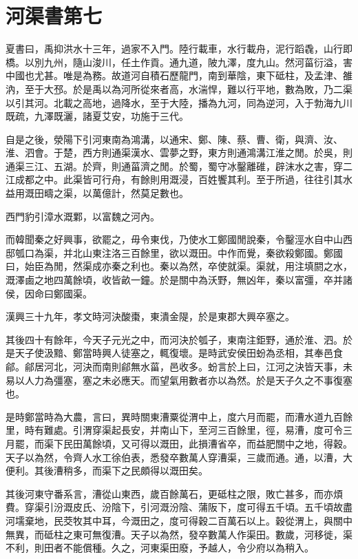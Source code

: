 \chapter{河渠書第七}

夏書曰，禹抑洪水十三年，過家不入門。陸行載車，水行載舟，泥行蹈毳，山行即橋。以別九州，隨山浚川，任土作貢。通九道，陂九澤，度九山。然河菑衍溢，害中國也尤甚。唯是為務。故道河自積石歷龍門，南到華陰，東下砥柱，及孟津、雒汭，至于大邳。於是禹以為河所從來者高，水湍悍，難以行平地，數為敗，乃二渠以引其河。北載之高地，過降水，至于大陸，播為九河，同為逆河，入于勃海九川既疏，九澤既灑，諸夏艾安，功施于三代。

自是之後，滎陽下引河東南為鴻溝，以通宋、鄭、陳、蔡、曹、衛，與濟、汝、淮、泗會。于楚，西方則通渠漢水、雲夢之野，東方則通鴻溝江淮之閒。於吳，則通渠三江、五湖。於齊，則通菑濟之閒。於蜀，蜀守冰鑿離碓，辟沫水之害，穿二江成都之中。此渠皆可行舟，有餘則用溉浸，百姓饗其利。至于所過，往往引其水益用溉田疇之渠，以萬億計，然莫足數也。

西門豹引漳水溉鄴，以富魏之河內。

而韓聞秦之好興事，欲罷之，毋令東伐，乃使水工鄭國閒說秦，令鑿涇水自中山西邸瓠口為渠，并北山東注洛三百餘里，欲以溉田。中作而覺，秦欲殺鄭國。鄭國曰，始臣為閒，然渠成亦秦之利也。秦以為然，卒使就渠。渠就，用注填閼之水，溉澤鹵之地四萬餘頃，收皆畝一鐘。於是關中為沃野，無凶年，秦以富彊，卒并諸侯，因命曰鄭國渠。

漢興三十九年，孝文時河決酸棗，東潰金隄，於是東郡大興卒塞之。

其後四十有餘年，今天子元光之中，而河決於瓠子，東南注鉅野，通於淮、泗。於是天子使汲黯、鄭當時興人徒塞之，輒復壞。是時武安侯田蚡為丞相，其奉邑食鄃。鄃居河北，河決而南則鄃無水菑，邑收多。蚡言於上曰，江河之決皆天事，未易以人力為彊塞，塞之未必應天。而望氣用數者亦以為然。於是天子久之不事復塞也。

是時鄭當時為大農，言曰，異時關東漕粟從渭中上，度六月而罷，而漕水道九百餘里，時有難處。引渭穿渠起長安，并南山下，至河三百餘里，徑，易漕，度可令三月罷，而渠下民田萬餘頃，又可得以溉田，此損漕省卒，而益肥關中之地，得穀。天子以為然，令齊人水工徐伯表，悉發卒數萬人穿漕渠，三歲而通。通，以漕，大便利。其後漕稍多，而渠下之民頗得以溉田矣。

其後河東守番系言，漕從山東西，歲百餘萬石，更砥柱之限，敗亡甚多，而亦煩費。穿渠引汾溉皮氏、汾陰下，引河溉汾陰、蒲阪下，度可得五千頃。五千頃故盡河壖棄地，民茭牧其中耳，今溉田之，度可得穀二百萬石以上。穀從渭上，與關中無異，而砥柱之東可無復漕。天子以為然，發卒數萬人作渠田。數歲，河移徙，渠不利，則田者不能償種。久之，河東渠田廢，予越人，令少府以為稍入。


